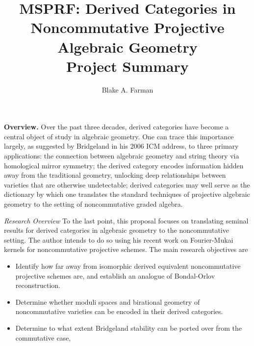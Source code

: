 \documentclass[11pt]{article}
\title{MSPRF: Derived Categories in Noncommutative Projective Algebraic Geometry\\\small{Project Summary}}
\author{Blake A. Farman}
\date{}
\begin{document}
\maketitle

\noindent\textbf{Overview.}
Over the past three decades, derived categories have become a central object of study in algebraic geometry.
One can trace this importance largely, as suggested by Bridgeland in his 2006 ICM address, to three primary applications: the connection between algebraic geometry and string theory via homological mirror symmetry; the derived category encodes information hidden away from the traditional geometry, unlocking deep relationships between varieties that are otherwise undetectable;
derived categories may well serve as the dictionary by which one translates the standard techniques of projective algebraic geometry to the setting of noncommutative graded algebra.

\noindent\emph{Research Overview}
To the last point, this proposal focuses on translating seminal results for derived categories in algebraic geometry to the noncommutative setting.
The author intends to do so using his recent work on Fourier-Mukai kernels for noncommutative projective schemes.
The main research objectives are
\begin{itemize}

\item
  Identify how far away from isomorphic derived equivalent noncommutative projective schemes are, and establish an analogue of Bondal-Orlov reconstruction.
\item
  Determine whether moduli spaces and birational geometry of noncommutative varieties can be encoded in their derived categories.
\item
  Determine to what extent Bridgeland stability can be ported over from the commutative case,
\end{itemize}
\end{document}
